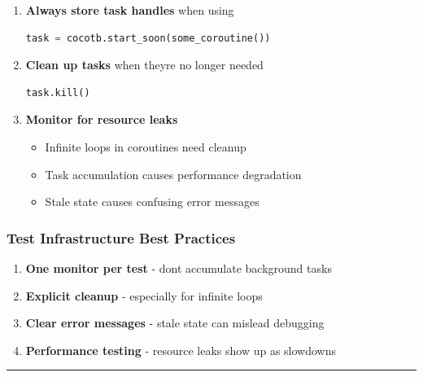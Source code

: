 \begin{record}

\begin{enumerate}
\def\labelenumi{\arabic{enumi}.}
\item
  \textbf{Always store task handles} when using

  \begin{lstlisting}[language=Python]
  task = cocotb.start_soon(some_coroutine())
  \end{lstlisting}
\item
  \textbf{Clean up tasks} when they\textquotesingle re no longer needed

  \begin{lstlisting}[language=Python]
  task.kill()
  \end{lstlisting}
\item
  \textbf{Monitor for resource leaks}

  \begin{itemize}
  \tightlist
  \item
    Infinite loops in coroutines need cleanup
  \item
    Task accumulation causes performance degradation
  \item
    Stale state causes confusing error messages
  \end{itemize}
\end{enumerate}

\end{record}

\subsubsection{Test Infrastructure Best Practices}\label{cr:fix:pc-mismatch-fix:test-infrastructure-best-practices}

\begin{record}

\begin{enumerate}
\def\labelenumi{\arabic{enumi}.}
\tightlist
\item
  \textbf{One monitor per test} - don\textquotesingle t accumulate
  background tasks
\item
  \textbf{Explicit cleanup} - especially for infinite loops
\item
  \textbf{Clear error messages} - stale state can mislead debugging
\item
  \textbf{Performance testing} - resource leaks show up as slowdowns
\end{enumerate}

\begin{center}\rule{0.5\linewidth}{0.5pt}\end{center}

\end{record}

